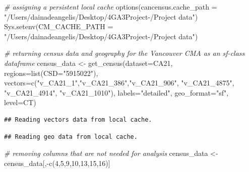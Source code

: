 \documentclass[
]{article}
\newenvironment{Shaded}{\begin{snugshade}}{\end{snugshade}}
\newcommand{\AttributeTok}[1]{\textcolor[rgb]{0.77,0.63,0.00}{#1}}
\newcommand{\CommentTok}[1]{\textcolor[rgb]{0.56,0.35,0.01}{\textit{#1}}}
\newcommand{\DecValTok}[1]{\textcolor[rgb]{0.00,0.00,0.81}{#1}}
\newcommand{\FunctionTok}[1]{\textcolor[rgb]{0.00,0.00,0.00}{#1}}
\newcommand{\NormalTok}[1]{#1}
\newcommand{\OtherTok}[1]{\textcolor[rgb]{0.56,0.35,0.01}{#1}}
\newcommand{\SpecialCharTok}[1]{\textcolor[rgb]{0.00,0.00,0.00}{#1}}
\newcommand{\StringTok}[1]{\textcolor[rgb]{0.31,0.60,0.02}{#1}}
\begin{document}
\begin{Shaded}
\begin{Highlighting}[]
\CommentTok{\# assigning a persistent local cache}
\FunctionTok{options}\NormalTok{(}\AttributeTok{cancensus.cache\_path =} \StringTok{"/Users/dainadeangelis/Desktop/4GA3Project{-}/Project data"}\NormalTok{)}
\FunctionTok{Sys.setenv}\NormalTok{(}\AttributeTok{CM\_CACHE\_PATH =} \StringTok{"/Users/dainadeangelis/Desktop/4GA3Project{-}/Project data"}\NormalTok{)}
\end{Highlighting}
\end{Shaded}

\begin{Shaded}
\begin{Highlighting}[]
\CommentTok{\# returning census data and geography for the Vancouver CMA as an sf{-}class dataframe}
\NormalTok{census\_data }\OtherTok{\textless{}{-}} \FunctionTok{get\_census}\NormalTok{(}\AttributeTok{dataset=}\StringTok{\textquotesingle{}CA21\textquotesingle{}}\NormalTok{, }\AttributeTok{regions=}\FunctionTok{list}\NormalTok{(}\AttributeTok{CSD=}\StringTok{"5915022"}\NormalTok{), }\AttributeTok{vectors=}\FunctionTok{c}\NormalTok{(}\StringTok{"v\_CA21\_1"}\NormalTok{,}\StringTok{"v\_CA21\_386"}\NormalTok{,}\StringTok{"v\_CA21\_906"}\NormalTok{, }\StringTok{"v\_CA21\_4875"}\NormalTok{, }\StringTok{"v\_CA21\_4914"}\NormalTok{, }\StringTok{"v\_CA21\_1010"}\NormalTok{), }\AttributeTok{labels=}\StringTok{"detailed"}\NormalTok{, }\AttributeTok{geo\_format=}\StringTok{"sf"}\NormalTok{, }\AttributeTok{level=}\StringTok{\textquotesingle{}CT\textquotesingle{}}\NormalTok{)}
\end{Highlighting}
\end{Shaded}

\begin{verbatim}
## Reading vectors data from local cache.
\end{verbatim}

\begin{verbatim}
## Reading geo data from local cache.
\end{verbatim}

\begin{Shaded}
\begin{Highlighting}[]
\CommentTok{\# removing columns that are not needed for analysis}
\NormalTok{census\_data }\OtherTok{\textless{}{-}}\NormalTok{ census\_data[,}\SpecialCharTok{{-}}\FunctionTok{c}\NormalTok{(}\DecValTok{4}\NormalTok{,}\DecValTok{5}\NormalTok{,}\DecValTok{9}\NormalTok{,}\DecValTok{10}\NormalTok{,}\DecValTok{13}\NormalTok{,}\DecValTok{15}\NormalTok{,}\DecValTok{16}\NormalTok{)]}
\end{Highlighting}
\end{Shaded}
\end{document}
